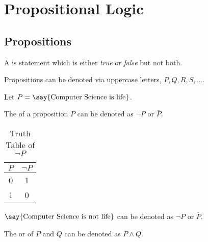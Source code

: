 \section{Propositional Logic} \label{sec:propositionanl_logic}

\subsection{Propositions}

\begin{definition} \label{def:proposition}
    A  is statement which is either \textit{true} or \textit{false} but not both.
\end{definition}

Propositions can be denoted via uppercase letters, $P, Q, R, S, \dots$.

\begin{example} \label{ex:proposition}
    Let $P = \text{\say{Computer Science is life}}$.
\end{example}

\begin{definition} \label{def:negation}
    The  of a proposition $P$ can be denoted as $\lnot P$ or $\bar{P}$.
\end{definition}

\begin{table}[htb]
    \centering
    \begin{tabular}[t]{cc}
        \toprule
        $P$   & $\lnot P$     \\
        \midrule
        0     & 1             \\
        1     & 0             \\
        \bottomrule
    \end{tabular}
    
    \caption{Truth Table of $\lnot P$}
    \label{table:truth_table_negation}
\end{table}

\begin{example}
    $\text{\say{Computer Science is not life}}$ can be denoted as $\lnot P$ or $\overline{P}$.
\end{example}

\begin{definition} \label{def:and}
    The  or  of $P$ and $Q$ can be denoted as $P \land Q$.
\end{definition}

